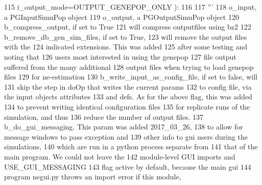 \begin{DoxyCode}
115                                     i\_output\_mode=OUTPUT\_GENEPOP\_ONLY ):  
116 
117         \textcolor{stringliteral}{'''}
118 \textcolor{stringliteral}{            o\_input, a PGInputSimuPop object}
119 \textcolor{stringliteral}{            o\_output, a PGOutputSimuPop object}
120 \textcolor{stringliteral}{            b\_compress\_output, if set to True}
121 \textcolor{stringliteral}{                will compress outputfiles using bz2}
122 \textcolor{stringliteral}{            b\_remove\_db\_gen\_sim\_files, if set to True,}
123 \textcolor{stringliteral}{                will remove the output files with the}
124 \textcolor{stringliteral}{                indicated extensions.  This was added}
125 \textcolor{stringliteral}{                after some testing and noting that}
126 \textcolor{stringliteral}{                users most interested in using the genepop}
127 \textcolor{stringliteral}{                file output suffered from the many additional}
128 \textcolor{stringliteral}{                output files when trying to load genepop files}
129 \textcolor{stringliteral}{                for ne-estimation}
130 \textcolor{stringliteral}{            b\_write\_input\_as\_config\_file, if set to false, will }
131 \textcolor{stringliteral}{                skip the step in doOp that writes the current params}
132 \textcolor{stringliteral}{                to config file, via the input objects attributes }
133 \textcolor{stringliteral}{                and defs. As for the above flag, this was added}
134 \textcolor{stringliteral}{                to prevent writing identical configuration files}
135 \textcolor{stringliteral}{                for replicate runs of the simulation, and thus}
136 \textcolor{stringliteral}{                reduce the number of output files. }
137 \textcolor{stringliteral}{            b\_do\_gui\_messaging.  This param was added 2017\_03\_26,}
138 \textcolor{stringliteral}{                to allow for message windows to pass exception and}
139 \textcolor{stringliteral}{                other info to gui users during the simulations,}
140 \textcolor{stringliteral}{                which are run in a python process separate from }
141 \textcolor{stringliteral}{                that of the main program.  We could not leave the}
142 \textcolor{stringliteral}{                module-level GUI imports and USE\_GUI\_MESSAGING}
143 \textcolor{stringliteral}{                flag active by default, because the main gui }
144 \textcolor{stringliteral}{                program negui.py throws an import error if this module,}

\end{DoxyCode}
